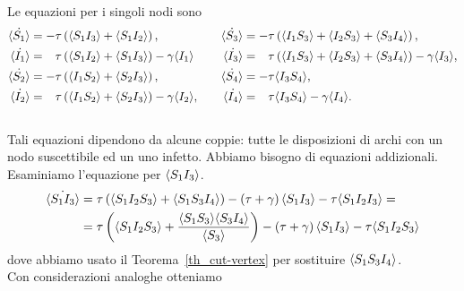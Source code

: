 Le equazioni per i singoli nodi sono 
 \begin{equation*}
 \begin{aligned}
 \dot{\angol{S_1}}&= -\tau \tonde{ \angol{ S_1 I_3} + \angol{S_1 I_2}},  \quad 
 &\dot{\angol{S_3}}&= -\tau \tonde{ \angol{I_1 S_3} + \angol{I_2 S_3}+ \angol{S_3 I_4}},  \\
 \dot{\angol{I_1}}&= \spa \tau \tonde{ \angol{ S_1 I_2} + \angol{S_1 I_3}} - \gamma\angol{I_1} \quad 
 &\dot{\angol{I_3}}&= \spa \tau \tonde{ \angol{I_1 S_3} + \angol{I_2 S_3}+ \angol{S_3 I_4}}-\gamma\angol{I_3},\\
 \dot{\angol{S_2}}&= -\tau \tonde{ \angol{ I_1 S_2} + \angol{S_2 I_3}}, \quad &\dot{\angol{S_4}} &= -\tau \angol{I_3S_4},  \\
 \dot{\angol{I_2}}&= \spa \tau \tonde{ \angol{ I_1 S_2} + \angol{S_2 I_3}} - \gamma\angol{I_2},\quad & \dot{\angol{I_4}}&=\spa \tau\angol{I_3S_4}-\gamma\angol{I_4}. \\\
 \end{aligned}	
 \end{equation*}
 Tali equazioni dipendono da alcune coppie: tutte le disposizioni di archi con un nodo suscettibile ed un uno infetto. Abbiamo bisogno di equazioni addizionali.\\
 Esaminiamo l'equazione per $\langle S_1 I_3 \rangle$. 
 \begin{equation*}
 \begin{aligned}	
 \dot{\langle S_1I_3 \rangle}&= \tau\left(  \langle S_1I_2S_3 \rangle + \langle S_1S_3I_4 \rangle \right) - \left(  \tau +\gamma \right)\langle S_1 I_3 \rangle -\tau \langle  S_1 I_2 I_3 \rangle= \\
 &= \tau \left(  \langle S_1I_2S_3 \rangle + \frac{ \langle S_1S_3 \rangle\langle S_3 I_4 \rangle}{\langle S_3 \rangle} \right) -\left(  \tau + \gamma \right) \langle S_1I_3 \rangle - \tau \langle S_1I_2S_3 \rangle
 \end{aligned}
 \end{equation*}
 dove abbiamo usato il Teorema~\ref{th_cut-vertex} per sostituire $\langle S_1S_3I_4 \rangle$.\\
 Con considerazioni analoghe otteniamo
